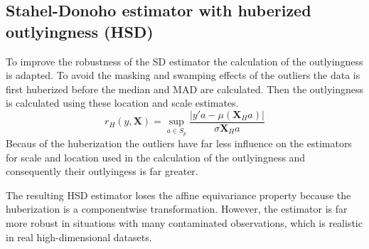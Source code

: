 \subsection{Stahel-Donoho estimator with huberized outlyingness (HSD)}
To improve the robustness of the SD estimator the calculation of the
outlyingness is adapted.
To avoid the masking and swamping effects of the outliers the data is first
huberized before the median and MAD are calculated.
Then the outlyingness is calculated using these location and scale estimates.
    \[ r_H(y,\mathbf{X}) = \sup_{a \in S_p} \frac{|y'a - \mu(\mathbf{X}_H a)|}
        {\sigma{\mathbf{X}_H a}} \]
Becaus of the huberization the outliers have far less influence on the
estimators for scale and location used in the calculation of the outlyingness
and consequently their outlyingess is far greater.

The resulting HSD estimator loses the affine equivariance property because the
huberization is a componentwise transformation.
However, the estimator is far more robust in situations with many contaminated
observations, which is realistic in real high-dimensional datasets.
